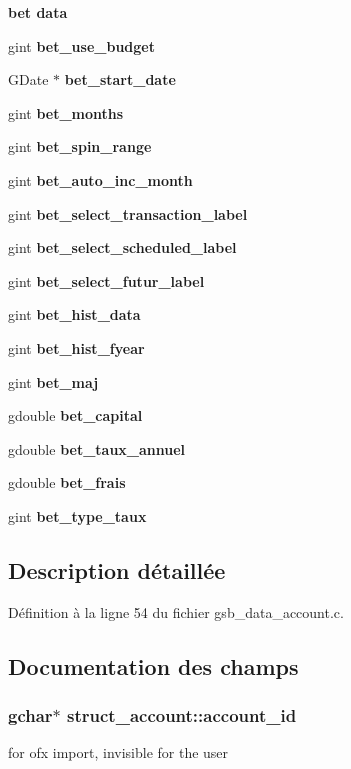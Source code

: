 \begin{Indent}{\bf bet data}\par
{\em \label{_amgrp36b8434f457dc768cea82a100025edab}
 }\begin{DoxyCompactItemize}
\item 
gint {\bf bet\_\-use\_\-budget}
\item 
GDate $\ast$ {\bf bet\_\-start\_\-date}
\item 
gint {\bf bet\_\-months}
\item 
gint {\bf bet\_\-spin\_\-range}
\item 
gint {\bf bet\_\-auto\_\-inc\_\-month}
\item 
gint {\bf bet\_\-select\_\-transaction\_\-label}
\item 
gint {\bf bet\_\-select\_\-scheduled\_\-label}
\item 
gint {\bf bet\_\-select\_\-futur\_\-label}
\item 
gint {\bf bet\_\-hist\_\-data}
\item 
gint {\bf bet\_\-hist\_\-fyear}
\item 
gint {\bf bet\_\-maj}
\item 
gdouble {\bf bet\_\-capital}
\item 
gdouble {\bf bet\_\-taux\_\-annuel}
\item 
gdouble {\bf bet\_\-frais}
\item 
gint {\bf bet\_\-type\_\-taux}
\end{DoxyCompactItemize}
\end{Indent}


\subsection{Description détaillée}


Définition à la ligne 54 du fichier gsb\_\-data\_\-account.c.



\subsection{Documentation des champs}
\subsubsection[{account\_\-id}]{\setlength{\rightskip}{0pt plus 5cm}gchar$\ast$ {\bf struct\_\-account::account\_\-id}}\label{structstruct__account_a43ada78f1616d2905c7440b14b707a99}
for ofx import, invisible for the user 

